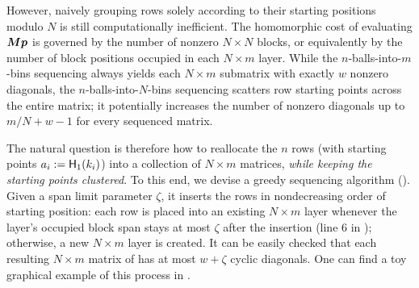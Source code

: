 However, naively grouping rows solely according to their starting positions modulo $N$ is still computationally inefficient. The homomorphic cost of evaluating $\bm{M}\bm{p}$ is governed by the number of nonzero $N\times N$ blocks, or equivalently by the number of block positions occupied in each $N\times m$ layer.
While the $n$-balls-into-$m$-bins sequencing always yields each $N\times m$ submatrix with exactly $w$ nonzero diagonals, the $n$-balls-into-$N$-bins sequencing scatters row starting points across the entire matrix; it potentially increases the number of nonzero diagonals up to $m/N + w-1$ for every sequenced matrix. 

The natural question is therefore how to reallocate the $n$ rows (with starting points $a_i := {\sf H}_1(k_i)$) into a collection of $N\times m$ matrices, \emph{while keeping the starting points clustered}. 
To this end, we devise a greedy sequencing algorithm (). Given a span limit parameter $\zeta$, it inserts the rows in nondecreasing order of starting position: each row is placed into an existing $N\times m$ layer whenever the layer's occupied block span stays at most $\zeta$ after the insertion (line 6 in ); otherwise, a new $N\times m$ layer is created. 
It can be easily checked that each resulting $N \times m$ matrix of  has at most $w+\zeta$ cyclic diagonals. One can find a toy graphical example of this process in .


\newcommand{\CondLine}[1]{%
  \Statex\hspace{\algorithmicindent}{\quad#1}%
}
\newcommand{\StateBox}[1]{%
  \State \parbox[t]{\dimexpr\linewidth-\algorithmicindent}{#1}%
}


